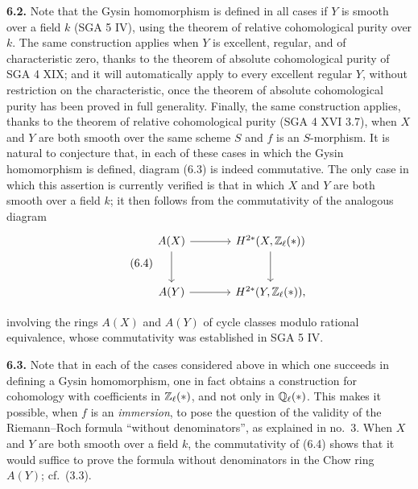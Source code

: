 \noindent\textbf{6.2.}
Note that the Gysin homomorphism is defined in all cases if $Y$ is smooth
over a field $k$ (SGA 5 IV), using the theorem of relative cohomological
purity over $k$. The same construction applies when $Y$ is excellent,
regular, and of characteristic zero, thanks to the theorem of absolute
cohomological purity of SGA 4 XIX; and it will automatically apply to every
excellent regular $Y$, without restriction on the characteristic, once the
theorem of absolute cohomological purity has been proved in full generality.
Finally, the same construction applies, thanks to the theorem of relative
cohomological purity (SGA 4 XVI 3.7), when $X$ and $Y$ are both smooth over
the same scheme $S$ and $f$ is an $S$-morphism. It is natural to conjecture
that, in each of these cases in which the Gysin homomorphism is defined,
diagram (6.3) is indeed commutative. The only case in which this assertion
is currently verified is that in which $X$ and $Y$ are both smooth over a
field $k$; it then follows from the commutativity of the analogous diagram
\begin{equation}\tag{6.4}
\begin{tikzcd}[column sep=large,row sep=large]
 A(X) \arrow[r] \arrow[d]
   & H^{2*}(X,\Zell(*)) \arrow[d] \\
 A(Y) \arrow[r]
   & H^{2*}(Y,\Zell(*)),
\end{tikzcd}
\end{equation}

involving the rings $A(X)$ and $A(Y)$ of cycle classes modulo rational
equivalence, whose commutativity was established in SGA 5 IV.

\noindent\textbf{6.3.}
Note that in each of the cases considered above in which one succeeds in
defining a Gysin homomorphism, one in fact obtains a construction for
cohomology with coefficients in $\mathbb Z_\ell(*)$, and not only in $\mathbb Q_\ell(*)$.
This makes it possible, when $f$ is an \emph{immersion}, to pose the question
of the validity of the Riemann--Roch formula ``without denominators'', as
explained in no.~3. When $X$ and $Y$ are both smooth over a field $k$, the
commutativity of (6.4) shows that it would suffice to prove the formula
without denominators in the Chow ring $A(Y)$; cf.~(3.3).


